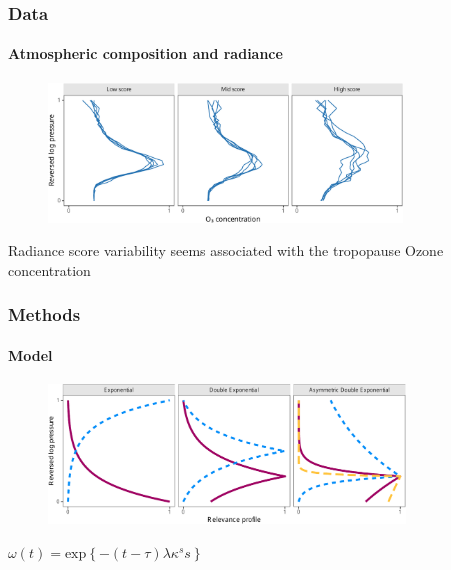 \documentclass{snedecorbeamer}
\begin{document}
\begin{frame}[c]
  \frametitle{Data}
  \framesubtitle{Atmospheric composition and radiance}

  \begin{figure}
    \centering
    \includegraphics[height=10em]{inc/mls_input_profiles}
  \end{figure}

  \begin{center}
    Radiance score variability seems associated with the tropopause Ozone
    concentration
  \end{center}

\end{frame}

\begin{frame}[c]
  \frametitle{Methods}
  \framesubtitle{Model}

  \begin{figure}
    \centering
    \includegraphics[height=10em]{inc/mls_weight_profiles}
  \end{figure}

  \begin{center}
    $\omega(t) = \text{exp}\left\{-(t - \tau) \lambda \kappa^s s\right\}$\\
  \end{center}

  \blankfootnote{
    Space:
    $\omega(t): \mathcal{T} = [0, 1] \to (0, 1]$,
    $s = \text{sign}(t - \tau)$,
    $\tau\in[0,1]$,
    $\lambda > 0$,
    $\kappa > 0$ \\
    \hspace{3.25ex}
    Priors:
    $\indent\tau \sim \textsc{Beta}$,
    $\lambda \sim \textsc{N}^{+}$,
    $\log(\kappa) \sim \textsc{N}$
  }
\end{frame}
\end{document}
